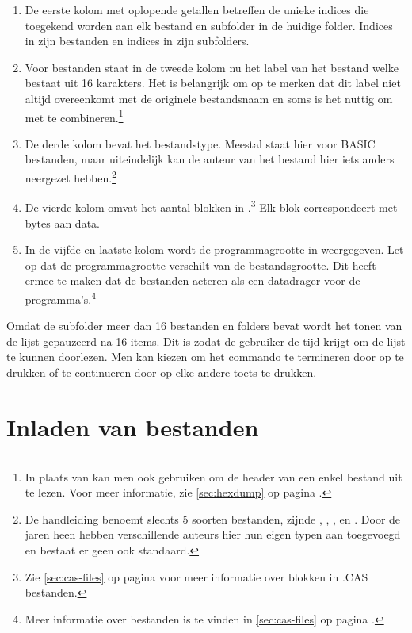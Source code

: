 \begin{enumerate}[noitemsep]
    \item De eerste kolom met oplopende getallen betreffen de unieke indices die toegekend worden aan elk bestand en subfolder in de huidige folder. Indices in  zijn bestanden en indices in  zijn subfolders.
    \item Voor \cas bestanden staat in de tweede kolom nu het label van het bestand welke bestaat uit 16 karakters. Het is belangrijk om op te merken dat dit label niet altijd overeenkomt met de originele bestandsnaam en soms is het nuttig om  met  te combineren.\footnote{In plaats van  kan men ook  gebruiken om de header van een enkel bestand uit te lezen. Voor meer informatie, zie \cref{sec:hexdump} op pagina \pageref{sec:hexdump}.}
    \item De derde kolom bevat het bestandstype. Meestal staat hier  voor BASIC bestanden, maar uiteindelijk kan de auteur van het \cas bestand hier iets anders neergezet hebben.\footnote{De  handleiding benoemt slechts 5 soorten bestanden, zijnde , , ,  en . Door de jaren heen hebben verschillende auteurs hier hun eigen typen aan toegevoegd en bestaat er geen ook standaard.}
    \item De vierde kolom omvat het aantal blokken in .\footnote{Zie \cref{sec:cas-files} op pagina \pageref{sec:cas-files} voor meer informatie over blokken in .CAS bestanden.} Elk blok correspondeert met  bytes aan data.
    \item In de vijfde en laatste kolom wordt de programmagrootte in  weergegeven. Let op dat de programmagrootte verschilt van de bestandsgrootte. Dit heeft ermee te maken dat de \cas bestanden acteren als een datadrager voor de programma's.\footnote{Meer informatie over \cas bestanden is te vinden in \cref{sec:cas-files} op pagina \pageref{sec:cas-files}.}
\end{enumerate}

Omdat de subfolder  meer dan 16 bestanden en folders bevat wordt het tonen van de lijst gepauzeerd na 16 items. Dit is zodat de gebruiker de tijd krijgt om de lijst te kunnen doorlezen. Men kan kiezen om het commando te termineren door op  te drukken of te continueren door op elke andere toets te drukken.

%
%
%
\section{Inladen van bestanden}
\label{sec:loading}

